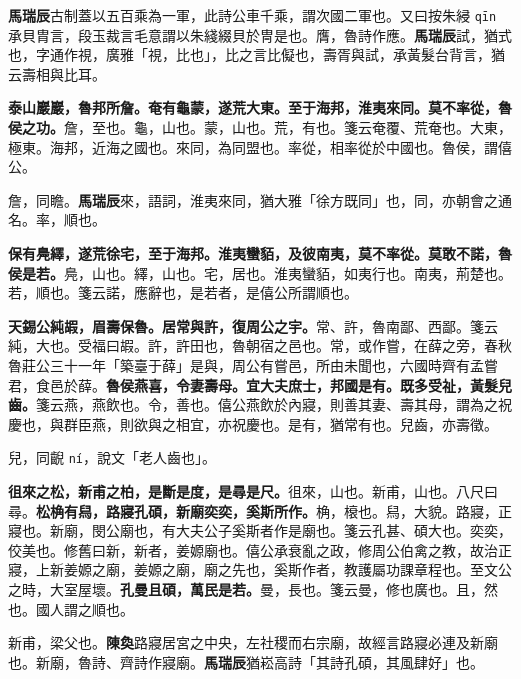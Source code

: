 \begin{quoting}\textbf{馬瑞辰}古制蓋以五百乘為一軍，此詩公車千乘，謂次國二軍也。又曰按朱綅 \texttt{qīn} 承貝胄言，段玉裁言毛意謂以朱綫綴貝於冑是也。膺，魯詩作應。\textbf{馬瑞辰}試，猶式也，字通作視，廣雅「視，比也」，比之言比儗也，壽胥與試，承黃髮台背言，猶云壽相與比耳。\end{quoting}

\textbf{泰山巖巖，魯邦所詹。奄有龜蒙，遂荒大東。至于海邦，淮夷來同。莫不率從，魯侯之功。}{\footnotesize 詹，至也。龜，山也。蒙，山也。荒，有也。箋云奄覆、荒奄也。大東，極東。海邦，近海之國也。來同，為同盟也。率從，相率從於中國也。魯侯，謂僖公。}

\begin{quoting}詹，同瞻。\textbf{馬瑞辰}來，語詞，淮夷來同，猶大雅「徐方既同」也，同，亦朝會之通名。率，順也。\end{quoting}

\textbf{保有鳧繹，遂荒徐宅，至于海邦。淮夷蠻貊，及彼南夷，莫不率從。莫敢不諾，魯侯是若。}{\footnotesize 鳧，山也。繹，山也。宅，居也。淮夷蠻貊，如夷行也。南夷，荊楚也。若，順也。箋云諾，應辭也，是若者，是僖公所謂順也。}

\textbf{天錫公純嘏，眉壽保魯。居常與許，復周公之宇。}{\footnotesize 常、許，魯南鄙、西鄙。箋云純，大也。受福曰嘏。許，許田也，魯朝宿之邑也。常，或作嘗，在薛之旁，春秋魯莊公三十一年「築臺于薛」是與，周公有嘗邑，所由未聞也，六國時齊有孟嘗君，食邑於薛。}\textbf{魯侯燕喜，令妻壽母。宜大夫庶士，邦國是有。既多受祉，黃髮兒齒。}{\footnotesize 箋云燕，燕飲也。令，善也。僖公燕飲於內寢，則善其妻、壽其母，謂為之祝慶也，與群臣燕，則欲與之相宜，亦祝慶也。是有，猶常有也。兒齒，亦壽徵。}

\begin{quoting}兒，同齯 \texttt{ní}，說文「老人齒也」。\end{quoting}

\textbf{徂來之松，新甫之柏，是斷是度，是尋是尺。}{\footnotesize 徂來，山也。新甫，山也。八尺曰尋。}\textbf{松桷有舄，路寢孔碩，新廟奕奕，奚斯所作。}{\footnotesize 桷，榱也。舄，大貌。路寢，正寢也。新廟，閔公廟也，有大夫公子奚斯者作是廟也。箋云孔甚、碩大也。奕奕，佼美也。修舊曰新，新者，姜嫄廟也。僖公承衰亂之政，修周公伯禽之教，故治正寢，上新姜嫄之廟，姜嫄之廟，廟之先也，奚斯作者，教護屬功課章程也。至文公之時，大室屋壞。}\textbf{孔曼且碩，萬民是若。}{\footnotesize 曼，長也。箋云曼，修也廣也。且，然也。國人謂之順也。}

\begin{quoting}新甫，梁父也。\textbf{陳奐}路寢居宮之中央，左社稷而右宗廟，故經言路寢必連及新廟也。新廟，魯詩、齊詩作寢廟。\textbf{馬瑞辰}猶崧高詩「其詩孔碩，其風肆好」也。\end{quoting}

